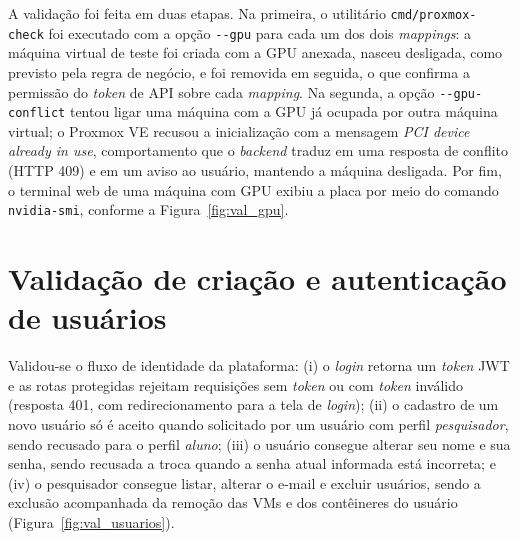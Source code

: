 \par A validação foi feita em duas etapas. Na primeira, o utilitário \texttt{cmd/proxmox-check} foi executado com a opção \texttt{-{}-gpu} para cada um dos dois \textit{mappings}: a máquina virtual de teste foi criada com a GPU anexada, nasceu desligada, como previsto pela regra de negócio, e foi removida em seguida, o que confirma a permissão do \textit{token} de API sobre cada \textit{mapping}. Na segunda, a opção \texttt{-{}-gpu-conflict} tentou ligar uma máquina com a GPU já ocupada por outra máquina virtual; o Proxmox VE recusou a inicialização com a mensagem \textit{PCI device already in use}, comportamento que o \textit{backend} traduz em uma resposta de conflito (HTTP 409) e em um aviso ao usuário, mantendo a máquina desligada. Por fim, o terminal web de uma máquina com GPU exibiu a placa por meio do comando \texttt{nvidia-smi}, conforme a Figura~\ref{fig:val_gpu}.


\section{Validação de criação e autenticação de usuários}

Validou-se o fluxo de identidade da plataforma: (i) o \textit{login} retorna um \textit{token} JWT e as rotas protegidas rejeitam requisições sem \textit{token} ou com \textit{token} inválido (resposta 401, com redirecionamento para a tela de \textit{login}); (ii) o cadastro de um novo usuário só é aceito quando solicitado por um usuário com perfil \textit{pesquisador}, sendo recusado para o perfil \textit{aluno}; (iii) o usuário consegue alterar seu nome e sua senha, sendo recusada a troca quando a senha atual informada está incorreta; e (iv) o pesquisador consegue listar, alterar o e-mail e excluir usuários, sendo a exclusão acompanhada da remoção das VMs e dos contêineres do usuário (Figura~\ref{fig:val_usuarios}).

